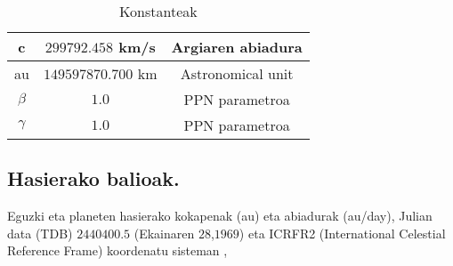 \begin{table}[h]
\caption{Konstanteak}
\label{tab:1}       %
\centering
\begin{tabular}{ c c c }
\hline
  c             &  $299792.458$ km/s           & Argiaren abiadura  \\
\hline
  au            &  $149597870.700$ km           & Astronomical unit  \\
\hline 	       
$\beta$          & $1.0$                       & PPN parametroa     \\
\hline 
$\gamma$         & $1.0$                       & PPN parametroa     \\
\hline
\end{tabular}
\end{table}

\subsection{Hasierako balioak.}

Eguzki eta planeten hasierako kokapenak (au) eta abiadurak (au/day), Julian data (TDB) $2440400.5$ (Ekainaren $28$,$1969$) eta ICRFR2 (International Celestial Reference Frame) koordenatu sisteman \cite{Folkner2014},

